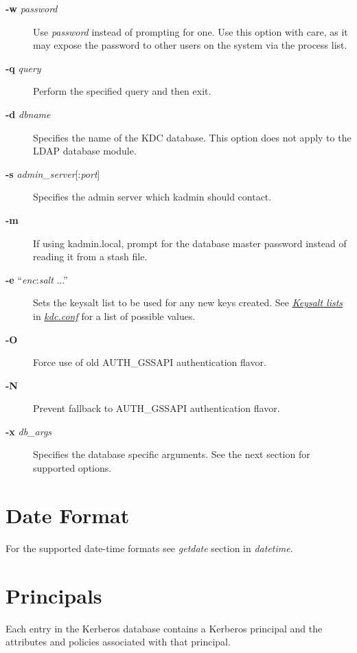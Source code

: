 \documentclass[letterpaper,10pt,english]{sphinxmanual}
\begin{document}
\begin{description}
\item[{\textbf{-w} \emph{password}}] \leavevmode
Use \emph{password} instead of prompting for one.  Use this option with
care, as it may expose the password to other users on the system
via the process list.

\item[{\textbf{-q} \emph{query}}] \leavevmode
Perform the specified query and then exit.

\item[{\textbf{-d} \emph{dbname}}] \leavevmode
Specifies the name of the KDC database.  This option does not
apply to the LDAP database module.

\item[{\textbf{-s} \emph{admin\_server}{[}:\emph{port}{]}}] \leavevmode
Specifies the admin server which kadmin should contact.

\item[{\textbf{-m}}] \leavevmode
If using kadmin.local, prompt for the database master password
instead of reading it from a stash file.

\item[{\textbf{-e} ``\emph{enc}:\emph{salt} ...''}] \leavevmode
Sets the keysalt list to be used for any new keys created.  See
{\hyperref[admin/conf_files/kdc_conf:keysalt-lists]{\emph{Keysalt lists}}} in {\hyperref[admin/conf_files/kdc_conf:kdc-conf-5]{\emph{kdc.conf}}} for a list of possible
values.

\item[{\textbf{-O}}] \leavevmode
Force use of old AUTH\_GSSAPI authentication flavor.

\item[{\textbf{-N}}] \leavevmode
Prevent fallback to AUTH\_GSSAPI authentication flavor.

\item[{\textbf{-x} \emph{db\_args}}] \leavevmode
Specifies the database specific arguments.  See the next section
for supported options.

\end{description}


\section{Date Format}
\label{admin/database:date-format}
For the supported date-time formats see \emph{getdate} section
in \emph{datetime}.


\section{Principals}
\label{admin/database:principals}
Each entry in the Kerberos database contains a Kerberos principal and
the attributes and policies associated with that principal.
\end{document}
